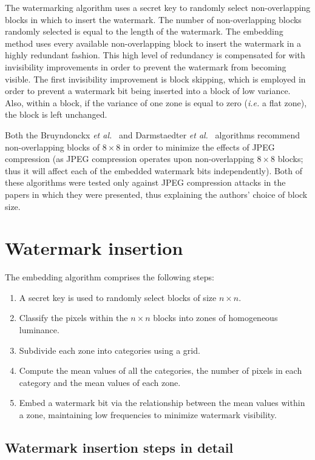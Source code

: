 \documentclass[12pt]{report}
\begin{document}
	The watermarking algorithm uses a secret key to randomly
	select non-overlapping blocks in which to insert the watermark. The number of non-overlapping blocks randomly
	selected is equal to the length of the watermark. 
	The embedding method uses every available non-overlapping block to insert the watermark
	in a highly redundant fashion. This high level of redundancy is compensated for with invisibility improvements in order
	to prevent the watermark from becoming visible.
	The first invisibility improvement is block skipping, which is employed in order to prevent
	a watermark bit being inserted into a block of low variance. Also, within a block, if the variance of one zone is equal
	to zero (\emph{i.e.} a flat zone), the block is left unchanged.

	Both the Bruyndonckx \emph{et al.}~\cite{BKX:bruyn1Pap} and Darmstaedter \emph{et al.}~\cite{ECCb4:darm1, ECCb4:darm2} algorithms 
	recommend non-overlapping blocks of $8 \times 8$ in order to minimize the effects of JPEG compression (as 
	JPEG compression operates upon non-overlapping $8 \times 8$ blocks; thus it will affect each of the embedded watermark bits independently). 
	Both of these algorithms were tested only against JPEG compression attacks in the papers in which they were presented, thus 
	explaining the authors' choice of block size.

\section{Watermark insertion}
	The embedding algorithm comprises the following steps:
    		\begin{enumerate}
			\item A secret key is used to randomly select blocks of size $n \times n$.
			\item Classify the pixels within the $n \times n$ blocks into zones of homogeneous luminance.
			\item Subdivide each zone into categories using a grid.
			\item Compute the mean values of all the categories, the number of pixels in each category and
				the mean values of each zone.
			\item Embed a watermark bit via the relationship between the mean values within a zone, maintaining
				low frequencies to minimize watermark visibility.
		\end{enumerate}
		
\subsection{Watermark insertion steps in detail}
	
\end{document}
